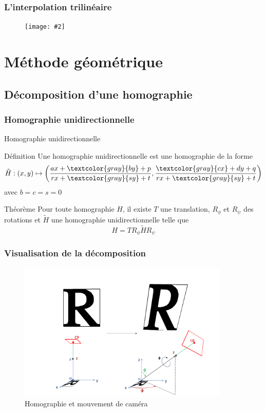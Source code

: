 \documentclass[c,12pt]{beamer}
\newcommand{\image}[2]{\begin{figure} \texttt{[image: \#2]}\end{figure}}
\newcommand{\gray}{\textcolor{gray}}
\newcommand{\fram}[2]{\begin{frame} \frametitle{#1} #2 \end{frame}}
\begin{document}
 
 \fram{L'interpolation trilinéaire}{\image{0.5}{intertri.jpg}}
 
     
     
     
     
     
\section{Méthode géométrique}
 
 \subsection{Décomposition d'une homographie}

  \subsubsection{Homographie unidirectionnelle}

  \begin{frame}{Homographie unidirectionnelle}
   \begin{block}{Définition}
    Une homographie unidirectionnelle est une homographie de la forme
    \[\tilde H : (x,y) \mapsto \left(\frac{ax+\gray{by}+p}{rx+\gray{sy}+t},\frac{\gray{cx}+dy+q}{rx+\gray{sy}+t}\right)\]
    avec $b=c=s=0$
   \end{block}
   \begin{block}{Théorème}
    Pour toute homographie $H$, il existe $T$ une translation, $R_\phi$ et $R_\psi$ des rotations et $\tilde H$ une homographie unidirectionnelle telle que
    \[H = T R_\phi \tilde H R_\psi\]
   \end{block}
  \end{frame}
  

  
\subsubsection{Visualisation de la décomposition}

  \begin{frame}
  \begin{figure}
   \centering
   \includegraphics[width=100mm]{beamer_decompo_all.png}
   \caption{Homographie et mouvement de caméra}
  \end{figure}
  \end{frame}
\end{document}
